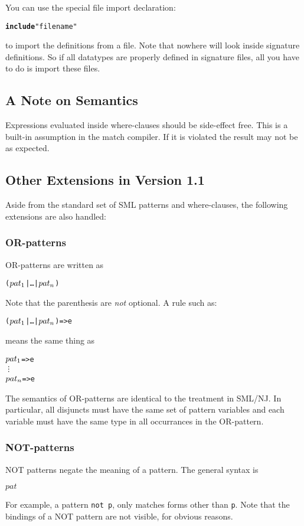 \documentclass{article}
\newcommand{\nowhere}{{\sf nowhere}}
\begin{document}
You can use the special file import declaration:
\begin{alltt}
  {\bf include} "filename"
\end{alltt}
to import the definitions from a file.  Note that \nowhere{} will look 
inside signature definitions.  So if all datatypes are
properly defined in signature files, all you have to do is import these
files.

\subsection{A Note on Semantics}
   Expressions evaluated inside where-clauses should be side-effect free.
This is a built-in assumption in the match compiler.  If it is violated
the result may not be as expected. 

\subsection{Other Extensions in Version 1.1}

  Aside from the standard set of SML patterns and where-clauses, 
the following extensions are also handled:
\subsubsection{OR-patterns}   OR-patterns are written as
\begin{alltt}
   (\(pat\sb{1}\) | \ldots | \(pat\sb{n}\))
\end{alltt}
Note that the parenthesis are {\em not} optional.  A rule such as:
\begin{alltt}
   (\(pat\sb{1}\) | \ldots | \(pat\sb{n}\)) => e
\end{alltt}
means the same thing as
\begin{alltt}
   \(pat\sb{1}\) => e
     \vdots
   \(pat\sb{n}\) => e
\end{alltt}
The semantics of OR-patterns are identical to the treatment in SML/NJ.
In particular, all disjuncts must have the same set of pattern variables
and each variable must have the same type in all occurrances in the OR-pattern. 

\subsubsection{NOT-patterns} NOT patterns negate the meaning of a pattern.
The general syntax is
\begin{alltt}
   \NOT \(pat\)
\end{alltt}
For example, a pattern \verb|not p|, only matches forms other than \verb|p|.
Note that the bindings of a NOT pattern are not visible, for obvious reasons.
\end{document}
